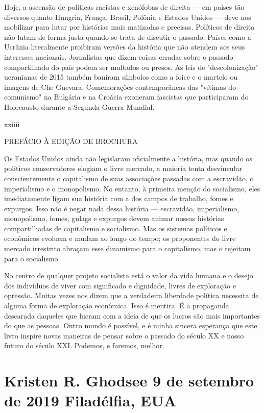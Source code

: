  \par 
Hoje, a ascensão de políticas racistas e xenófobas de direita — em países tão diversos quanto Hungria, França, Brasil, Polônia e Estados Unidos — deve nos mobilizar para lutar por histórias mais matizadas e precisas. Políticos de direita não lutam de forma justa quando se trata de discutir o passado. Países como a Ucrânia literalmente proibiram versões da história que não atendem aos seus interesses nacionais. Jornalistas que dizem coisas erradas sobre o passado compartilhado do país podem ser multados ou presos. As leis de "descolonização" ucranianas de 2015 também baniram símbolos como a foice e o martelo ou imagens de Che Guevara. Comemorações contemporâneas das "vítimas do comunismo" na Bulgária e na Croácia exoneram fascistas que participaram do Holocausto durante a Segunda Guerra Mundial.
 \par 
xxiiii
 \par 
PREFÁCIO À EDIÇÃO DE BROCHURA
 \par 
Os Estados Unidos ainda não legislaram oficialmente a história, mas quando os políticos conservadores elogiam o livre mercado, a maioria tenta desvincular conscientemente o capitalismo de suas associações passadas com a escravidão, o imperialismo e o monopolismo. No entanto, à primeira menção do socialismo, eles imediatamente ligam sua história com a dos campos de trabalho, fomes e expurgos. Isso não é negar nada dessa história — escravidão, imperialismo, monopolismo, fomes, gulags e expurgos devem animar nossas histórias compartilhadas de capitalismo e socialismo. Mas os sistemas políticos e econômicos evoluem e mudam ao longo do tempo; os proponentes do livre mercado irrestrito abraçam esse dinamismo para o capitalismo, mas o rejeitam para o socialismo.
 \par 
No centro de qualquer projeto socialista está o valor da vida humana e o desejo dos indivíduos de viver com significado e dignidade, livres de exploração e opressão. Muitas vezes nos dizem que a verdadeira liberdade política necessita de alguma forma de exploração econômica. Isso é mentira. É a propaganda descarada daqueles que lucram com a ideia de que os lucros são mais importantes do que as pessoas. Outro mundo é possível, e é minha sincera esperança que este livro inspire novas maneiras de pensar sobre o passado do século XX e nosso futuro do século XXI. Podemos, e faremos, melhor.
 \par 
\section{Kristen R. Ghodsee 9 de setembro de 2019 Filadélfia, EUA}